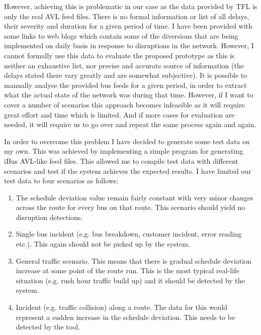 However, achieving this is problematic in our case as the data provided by TFL is only the real AVL feed files.
There is no formal information or list of all delays, their severity and duration for a given period of time. I have been provided with some links to web blogs which contain some of the diversions that are being implemented on daily basis in response to disruptions in the network. However, I cannot formally use this data to evaluate the proposed prototype as this is neither an exhaustive list, nor precise and accurate source of information (the delays stated there vary greatly and are somewhat subjective). It is possible to manually analyse the provided bus feeds for a given period, in order to extract what the actual state of the network was during that time. However, if I want to cover a number of scenarios this approach becomes infeasible as it will require great effort and time which is limited. And if more cases for evaluation are needed, it will require us to go over and repeat the same process again and again.

In order to overcome this problem I have decided to generate some test data on my own. This was achieved by implementing a simple program for generating iBus AVL-like feed files. This allowed me to compile test data with different scenarios and test if the system achieves the expected results. I have limited our test data to four scenarios as follows:
\begin{enumerate}
	\item The schedule deviation value remain fairly constant with very minor changes across the route for every bus on that route. This scenario should yield no disruption detections.
	\item Single bus incident (e.g. bus breakdown, customer incident, error reading etc.). This again should not be picked up by the system.
	\item General traffic scenario. This means that there is gradual schedule deviation increase at some point of the route run. This is the most typical real-life situation (e.g. rush hour traffic build up) and it should be detected by the system.
	\item Incident (e.g. traffic collision) along a route. The data for this would represent a sudden increase in the schedule deviation. This needs to be detected by the tool.
\end{enumerate}


